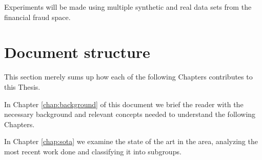 Experiments will be made using multiple synthetic and real data sets from the financial fraud space.

\section{Document structure} 
This section merely sums up how each of the following Chapters contributes to this Thesis.

In Chapter \ref{chap:background} of this document we brief the reader with the necessary background and relevant concepts needed to understand the following Chapters.

In Chapter \ref{chap:sota} we examine the state of the art in the area, analyzing the most recent work done and classifying it into subgroups.


